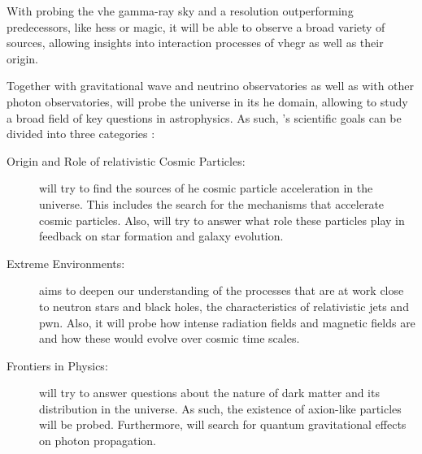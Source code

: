 With \cta{} probing the \gls{vhe} gamma-ray sky and a resolution outperforming predecessors, like
\gls{hess} or \gls{magic}, it will be able to observe a broad variety of sources, allowing insights
into interaction processes of \gls{vhegr} as well as their origin.

Together with gravitational wave and neutrino observatories as well as with other photon observatories,
\cta{} will probe the universe in its \gls{he} domain, allowing to study a broad field of key questions
in astrophysics. As such, \cta's scientific goals can be divided into three categories \cite{cta_scientific_goals}:
\begin{description}
    \item [Origin and Role of relativistic Cosmic Particles:] \cta{} will try to find the sources of
    \gls{he} cosmic particle acceleration in the universe. This includes the search for the mechanisms
    that accelerate cosmic particles. Also, \cta{} will try to answer what role these particles play
    in feedback on star formation and galaxy evolution.
    \item [Extreme Environments:] \cta{} aims to deepen our understanding of the processes that
    are at work close to neutron stars and black holes, the characteristics of relativistic jets and
    \gls{pwn}. Also, it will probe how intense radiation fields and magnetic fields are and how these
    would evolve over cosmic time scales.
    \item [Frontiers in Physics:] \cta{} will try to answer questions about the nature of dark matter
    and its distribution in the universe. As such, the existence of axion-like particles will be
    probed. Furthermore, \cta{} will search for quantum gravitational effects on photon propagation.
\end{description}

